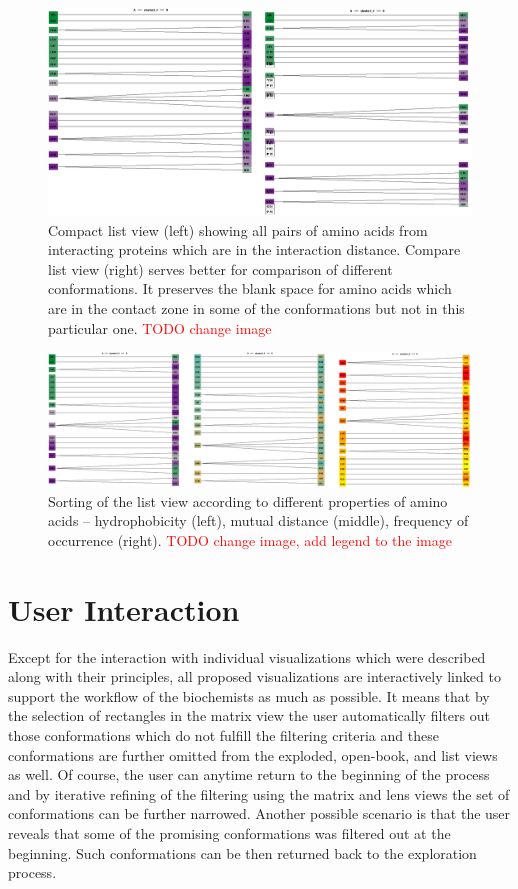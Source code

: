 \documentclass[journal]{vgtc}                %
\begin{document}
\begin{figure}[bt]
  \centering
  \includegraphics[width=1.0\columnwidth]{list.png}
  \caption{Compact list view (left) showing all pairs of amino acids from interacting proteins which are in the interaction distance. Compare list view (right) serves better for comparison of different conformations. It preserves the blank space for amino acids which are in the contact zone in some of the conformations but not in this particular one. \textcolor{red}{TODO change image}}
  \label{fig:list}
\end{figure}

\begin{figure}[bt]
  \centering
  \includegraphics[width=1.0\columnwidth]{sorting.png}
  \caption{Sorting of the list view according to different properties of amino acids -- hydrophobicity (left), mutual distance (middle), frequency of occurrence (right). \textcolor{red}{TODO change image, add legend to the image}}
  \label{fig:sorting}
\end{figure}


\section{User Interaction}
Except for the interaction with individual visualizations which were described along with their principles, all proposed visualizations are interactively linked to support the workflow of the biochemists as much as possible.
It means that by the selection of rectangles in the matrix view the user automatically filters out those conformations which do not fulfill the filtering criteria and these conformations are further omitted from the exploded, open-book, and list views as well.
Of course, the user can anytime return to the beginning of the process and by iterative refining of the filtering using the matrix and lens views the set of conformations can be further narrowed.
Another possible scenario is that the user reveals that some of the promising conformations was filtered out at the beginning.
Such conformations can be then returned back to the exploration process.
\end{document}
